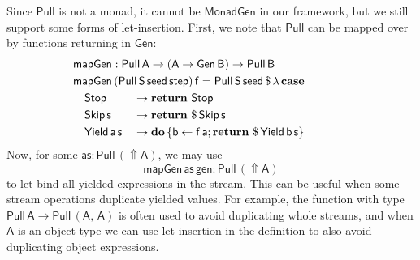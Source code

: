 \documentclass[acmsmall,screen,review,anonymous]{acmart}
\newcommand{\mit}[1]{{\mathsf{#1}}}
\newcommand{\msf}[1]{{\mathsf{#1}}}
\newcommand{\mbf}[1]{{\mathbf{#1}}}
\newcommand{\mdo}{\mbf{do}\,}
\newcommand{\ind}{\hspace{1em}}
\newcommand{\return}{\mbf{return}\,}
\newcommand{\lam}{\lambda\,}
\newcommand{\vas}{\mathsf{as}}
\newcommand{\vA}{\mathsf{A}}
\newcommand{\vB}{\mathsf{B}}
\newcommand{\vS}{\mathsf{S}}
\newcommand{\va}{\mathsf{a}}
\newcommand{\vb}{\mathsf{b}}
\newcommand{\vf}{\mathsf{f}}
\newcommand{\vs}{\mathsf{s}}
\newcommand{\fro}{\leftarrow}
\newcommand{\case}{\mbf{case\,}}
\newcommand{\Lift}{{\Uparrow}}
\theoremstyle{remark}
\newcommand{\Gen}{\msf{Gen}}
\newcommand{\gen}{\mit{gen}}
\newcommand{\MonadGen}{\msf{MonadGen}}
\newcommand{\Stop}{\msf{Stop}}
\newcommand{\Skip}{\msf{Skip}}
\newcommand{\Yield}{\msf{Yield}}
\newcommand{\dlr}{\,\$\,}
\newcommand{\seed}{\mit{seed}}
\newcommand{\step}{\mit{step}}
\newcommand{\Pull}{\msf{Pull}}
\begin{document}
Since $\Pull$ is not a monad, it cannot be $\MonadGen$ in our framework,
but we still support some forms of let-insertion. First, we note that $\Pull$ can be
mapped over by functions returning in $\Gen$:
\begin{alignat*}{3}
  &\hspace{-3em}\mathrlap{\mit{mapGen} : \Pull\,\vA \to (\vA \to \Gen\,\vB) \to \Pull\,\vB }\\
  &\hspace{-3em}\mathrlap{\mit{mapGen}\,(\Pull\,\vS\,\seed\,\step)\,\vf = \Pull\,\vS\,\seed \dlr \lam \case}\\
  &\hspace{-3em} \ind \Stop            &&\to \return\,\Stop \\
  &\hspace{-3em} \ind \Skip\,\vs       &&\to \return \dlr \Skip\,\vs\\
  &\hspace{-3em} \ind \Yield\,\va\,\vs &&\to \mdo \{\vb \fro \vf\,\va; \return \dlr \Yield\,\vb\,\vs\}
\end{alignat*}
Now, for some $\vas : \Pull\,(\Lift \vA)$, we may use
\[ \mit{mapGen}\,\vas\,\gen : \Pull\,(\Lift \vA) \]
to let-bind all yielded expressions in the stream. This can be useful when some
stream operations duplicate yielded values. For example, the function with type
$\Pull\,\vA \to \Pull\,(\vA,\,\vA)$ is often used to avoid duplicating whole streams,
and when $\vA$ is an object type we can use let-insertion in the definition to also
avoid duplicating object expressions.
\end{document}
